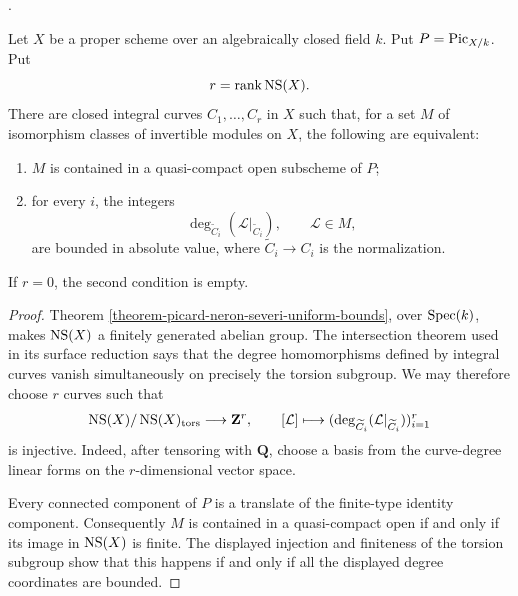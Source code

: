 \begin{lemma}
\label{lemma-picard-boundedness-finite-curves}
\begin{reference}
\cite[Supplement to Expos\'e 236, (vii), p. 305]{FGA}.
\end{reference}
Let $X$ be a proper scheme over an algebraically closed field $k$. Put
$P = \mathrm{Pic}_{X/k}$. Put
$$
r = \mathop{\rm rank} \mathop{\rm NS}(X).
$$
There are closed integral curves $C_1,\ldots,C_r$ in $X$ such that, for a set
$M$ of isomorphism classes of invertible modules on $X$, the following are
equivalent:
\begin{enumerate}
\item $M$ is contained in a quasi-compact open subscheme of $P$;
\item for every $i$, the integers
$$
\deg_{\widetilde C_i}(\mathcal{L}|_{\widetilde C_i}),
\qquad \mathcal{L} \in M,
$$
are bounded in absolute value, where $\widetilde C_i \to C_i$ is the
normalization.
\end{enumerate}
If $r = 0$, the second condition is empty.
\end{lemma}

\begin{proof}
Theorem \ref{theorem-picard-neron-severi-uniform-bounds}, over
$\mathop{\mathrm{Spec}}(k)$, makes $\mathop{\rm NS}(X)$ a finitely generated abelian group.
The intersection theorem used in its surface reduction says that the degree
homomorphisms defined by integral curves vanish simultaneously on precisely
the torsion subgroup. We may therefore choose $r$ curves such that
$$
\mathop{\rm NS}(X)/\mathop{\rm NS}(X)_{\rm tors}
\longrightarrow \mathbf{Z}^r,\qquad
[\mathcal{L}] \longmapsto
(\deg_{\widetilde C_i}(\mathcal{L}|_{\widetilde C_i}))_{i = 1}^r
$$
is injective. Indeed, after tensoring with $\mathbf{Q}$, choose a basis from
the curve-degree linear forms on the $r$-dimensional vector space.

Every connected component of $P$ is a translate of the finite-type identity
component. Consequently $M$ is contained in a quasi-compact open if and only
if its image in $\mathop{\rm NS}(X)$ is finite. The displayed injection and
finiteness of the torsion subgroup show that this happens if and only if all
the displayed degree coordinates are bounded.
\end{proof}

